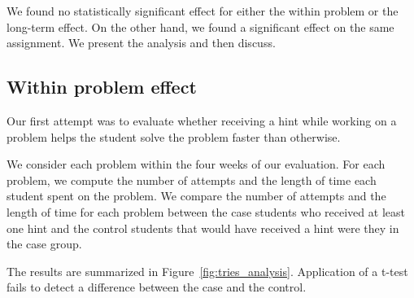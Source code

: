 \documentclass{llncs2e/llncs}
\begin{document}
We found no statistically significant effect for either the within problem or the long-term effect. On the other hand, we found a significant effect on the same assignment. We present the analysis and then discuss.

\subsection{Within problem effect}

Our first attempt was to evaluate whether receiving a hint while
working on a problem helps the student solve the problem faster than otherwise.

We consider each problem within the four weeks of our evaluation. For each problem, we compute the number of attempts and the length of time each student spent on the problem. We compare the number of attempts and the length of time for each problem between the case students who
received at least one hint and the control students that would have received a hint were they in the case group.

The results are summarized in Figure~\ref{fig:tries_analysis}. Application of a t-test fails
to detect a difference between the case and the control.
\end{document}
